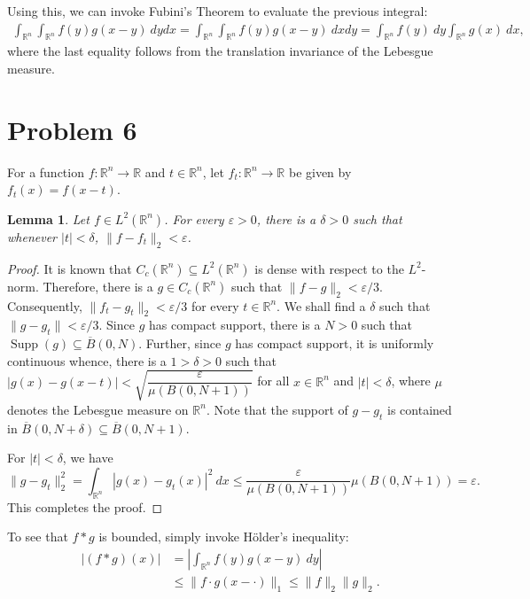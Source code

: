 \documentclass[12pt]{amsart}
\newtheorem*{lemma}{Lemma}
\newcommand{\R}{\mathbb{R}}
\newcommand{\Supp}{\operatorname{Supp}}
\begin{document}
Using this, we can invoke Fubini's Theorem to evaluate the previous integral:
\begin{align*}
    \int_{\R^n}\int_{\R^n} f(y)g(x - y)~dydx = \int_{\R^n}\int_{\R^n}f(y)g(x - y)~dxdy = \int_{\R^n} f(y)~dy\int_{\R^n} g(x)~dx,
\end{align*}
where the last equality follows from the translation invariance of the Lebesgue measure.

\section*{Problem 6}

For a function $f:\R^n\to\R$ and $t\in\R^n$, let $f_t:\R^n\to\R$ be given by $f_t(x) = f(x - t)$. 

\begin{lemma}
    Let $f\in L^2(\R^n)$. For every $\varepsilon > 0$, there is a $\delta > 0$ such that whenever $|t| < \delta$, $\|f - f_t\|_2 < \varepsilon$.
\end{lemma}
\begin{proof}
    It is known that $C_c(\R^n)\subseteq L^2(\R^n)$ is dense with respect to the $L^2$-norm. Therefore, there is a $g\in C_c(\R^n)$ such that $\|f - g\|_{2} < \varepsilon/3$. Consequently, $\|f_t - g_t\|_2 < \varepsilon/3$ for every $t\in\R^n$. We shall find a $\delta$ such that $\|g - g_t\| < \varepsilon/3$. Since $g$ has compact support, there is a $N > 0$ such that $\Supp(g)\subseteq\overline B(0, N)$. Further, since $g$ has compact support, it is uniformly continuous whence, there is a $1 > \delta > 0$ such that $|g(x) - g(x - t)| < \sqrt{\dfrac{\varepsilon}{\mu(B(0, N + 1))}}$ for all $x\in\R^n$ and $|t| < \delta$, where $\mu$ denotes the Lebesgue measure on $\R^n$. Note that the support of $g - g_t$ is contained in $\overline B(0, N + \delta)\subseteq\overline B(0, N + 1)$. 

    For $|t| < \delta$, we have 
    \begin{equation*}
        \|g - g_t\|_2^2 = \int_{\R^n} |g(x) - g_t(x)|^2~dx\le\frac{\varepsilon}{\mu(B(0, N + 1))}\mu(B(0, N + 1)) = \varepsilon.
    \end{equation*}
    This completes the proof.
\end{proof}

To see that $f\ast g$ is bounded, simply invoke H\"older's inequality: 
\begin{align*}
    |(f\ast g)(x)| &= \left|\int_{\R^n}f(y)g(x - y)~dy\right|\\
    &\le\|f\cdot g(x - \cdot)\|_1\le\|f\|_2\|g\|_2.
\end{align*}
\end{document}

